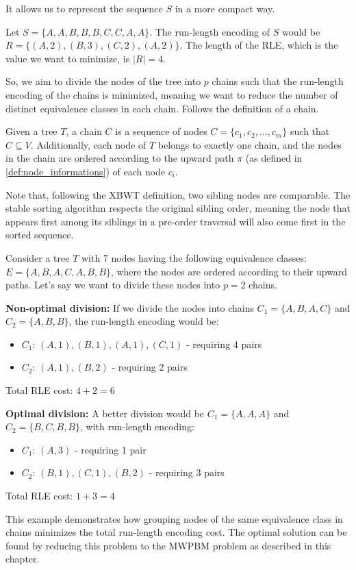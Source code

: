 It allows us to represent the sequence $S$ in a more compact way. 

\begin{example}
    Let $S = \{A, A, B, B, B, C, C, A, A\}$. The run-length encoding of $S$ would be $R = \{(A, 2), (B, 3), (C, 2), (A, 2)\}$. The length of the RLE, which is the value we want to minimize, is $|R|=4$.
\end{example}

So, we aim to divide the nodes of the tree into $p$ chains such that the run-length encoding of the chains is minimized, meaning we want to reduce the number of distinct equivalence classes in each chain. Follows the definition of a chain.

\begin{definition}[Chains] \label{def:chains}
    Given a tree $T$, a chain $C$ is a sequence of nodes $C = \{c_1, c_2, \dots, c_m\}$ such that $C\subseteq V$. Additionally, each node of $T$ belongs to exactly one chain, and the nodes in the chain are ordered according to the upward path $\pi$ (as defined in \cref{def:node_informations}) of each node $c_i$.
\end{definition}

Note that, following the XBWT definition, two sibling nodes are comparable. The stable sorting algorithm respects the original sibling order, meaning the node that appears first among its siblings in a pre-order traversal will also come first in the sorted sequence.

\begin{example}
    Consider a tree $T$ with 7 nodes having the following equivalence classes: $E = \{A, B, A, C, A, B, B\}$, where the nodes are ordered according to their upward paths. Let's say we want to divide these nodes into $p = 2$ chains.
    
    \textbf{Non-optimal division:} If we divide the nodes into chains $C_1 = \{A, B, A, C\}$ and $C_2 = \{A, B, B\}$, the run-length encoding would be:
    \begin{itemize}
        \item $C_1$: $(A,1), (B,1), (A,1), (C,1)$ - requiring 4 pairs
        \item $C_2$: $(A,1), (B,2)$ - requiring 2 pairs
    \end{itemize}
    Total RLE cost: $4 + 2 = 6$
    
    \textbf{Optimal division:} A better division would be $C_1 = \{A, A, A\}$ and $C_2 = \{B, C, B, B\}$, with run-length encoding:
    \begin{itemize}
        \item $C_1$: $(A,3)$ - requiring 1 pair
        \item $C_2$: $(B,1), (C,1), (B,2)$ - requiring 3 pairs
    \end{itemize}
    Total RLE cost: $1 + 3 = 4$
    
    This example demonstrates how grouping nodes of the same equivalence class in chains minimizes the total run-length encoding cost. The optimal solution can be found by reducing this problem to the \textsc{MWPBM} problem as described in this chapter.
\end{example}

